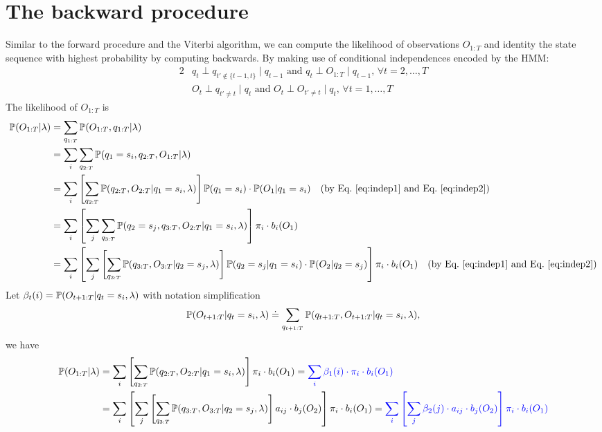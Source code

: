 \section{The backward procedure}
\label{sec:backward}

Similar to the forward procedure and the Viterbi algorithm, 
we can compute the likelihood of observations $O_{1:T}$ and identity the state sequence with highest probability by computing backwards.
By making use of conditional independences encoded by the HMM:
\begin{alignat}{2}
& q_t \perp q_{t' \notin \{t-1,t\}} \mid q_{t-1} \text{~and~} q_t \perp O_{1:T} \mid q_{t-1}, \, \forall t=2,\dots,T  \label{eq:indep1} \\
& O_t \perp q_{t' \ne t} \mid q_t \text{~and~} O_t \perp O_{t' \ne t} \mid q_t, \, \forall t=1,\dots,T                \label{eq:indep2}
\end{alignat}
The likelihood of $O_{1:T}$ is 
\begin{align*}
\mathbb{P}(O_{1:T} |\lambda) 
&= \sum_{q_{1:T}} \mathbb{P}(O_{1:T},q_{1:T} |\lambda) \\
&= \sum_{i} \sum_{q_{2:T}} \mathbb{P}(q_1 = s_i, q_{2:T}, O_{1:T} |\lambda) \\
&= \sum_{i} \left[ \sum_{q_{2:T}} \mathbb{P}(q_{2:T}, O_{2:T} |q_1 = s_i, \lambda) \right] \mathbb{P}(q_1 = s_i) \cdot \mathbb{P}(O_1 |q_1 = s_i) 
   ~~~ \text{(by Eq.~\ref{eq:indep1} and Eq.~\ref{eq:indep2})} \\
&= \sum_{i} \left[ \sum_{j} \sum_{q_{3:T}} \mathbb{P}(q_2 = s_j, q_{3:T}, O_{2:T} |q_1 = s_i, \lambda) \right] \pi_i \cdot b_i(O_1) \\
&= \sum_{i} \left[ \sum_{j} \left[ \sum_{q_{3:T}} \mathbb{P}(q_{3:T}, O_{3:T} |q_2 = s_j, \lambda) \right] \mathbb{P}(q_2 = s_j |q_1 = s_i) \cdot \mathbb{P}(O_2 |q_2 = s_j) 
   \right] \pi_i \cdot b_i(O_1) 
   ~~~ \text{(by Eq.~\ref{eq:indep1} and Eq.~\ref{eq:indep2})}
\end{align*}
Let $\beta_t(i) = \mathbb{P}(O_{t+1:T} |q_t = s_i, \lambda)$ with notation simplification
\begin{equation*}
\mathbb{P}(O_{t+1:T} |q_t = s_i, \lambda) \doteq \sum_{q_{t+1:T}} \mathbb{P}(q_{t+1:T}, O_{t+1:T} |q_t = s_i, \lambda),
\end{equation*}
we have
\begin{alignat}{2}
\mathbb{P}(O_{1:T} |\lambda) 
&= \sum_{i} \left[ \sum_{q_{2:T}} \mathbb{P}(q_{2:T}, O_{2:T} |q_1 = s_i, \lambda) \right] \pi_i \cdot b_i(O_1) 
 = {\color{blue}{\sum_{i} \beta_1(i) \cdot \pi_i \cdot b_i(O_1)}}  \label{eq:likelihood-backward} \\
&= \sum_{i} \left[ \sum_{j} \left[ \sum_{q_{3:T}} \mathbb{P}(q_{3:T}, O_{3:T} |q_2 = s_j, \lambda) \right] a_{ij} \cdot b_j(O_2) \right] \pi_i \cdot b_i(O_1) 
 = {\color{blue}{\sum_{i} \left[ \sum_{j} \beta_2(j) \cdot a_{ij} \cdot b_j(O_2) \right] \pi_i \cdot b_i(O_1)}}  \nonumber
\end{alignat}
